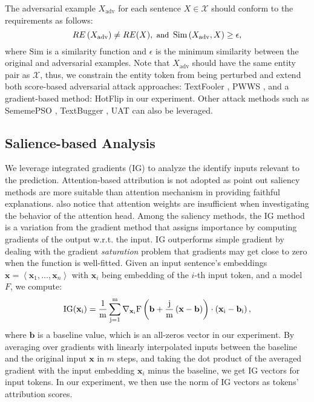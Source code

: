\documentclass[sigconf]{acmart}
\begin{document}
The adversarial example $X_{\mathrm{adv}}$ for each sentence $X \in \mathcal{X}$  should conform to the requirements as follows: 
\begin{equation}
\small
RE\left(X_{\mathrm{adv}} \right) \neq RE(X), \text { and } \operatorname{Sim}\left(X_{\mathrm{adv}}, X\right) \geq \epsilon,
\label{eq:ad_requirement}
\end{equation}
where $\mathrm{Sim}$ is a similarity function  and $\epsilon$ is the minimum similarity between the original and adversarial examples.
Note that $X_{\mathrm{adv}}$ should have the same entity pair as $\mathcal{X}$, thus, we constrain the entity token from being perturbed and extend both score-based adversarial attack approaches: TextFooler \cite{DBLP:conf/aaai/JinJZS20}, PWWS \cite{DBLP:conf/acl/RenDHC19}, and a gradient-based method: HotFlip \cite{DBLP:conf/acl/EbrahimiRLD18} in our experiment.
Other attack methods such as SememePSO \cite{zang-etal-2020-word}, TextBugger \cite{DBLP:conf/ndss/LiJDLW19}, UAT \cite{wallace-etal-2019-universal} can also be leveraged.

\subsection{Salience-based Analysis}
We leverage integrated gradients \cite{DBLP:conf/icml/SundararajanTY17} (IG) to analyze the identify inputs relevant to the prediction.
Attention-based attribution \cite{DBLP:conf/emnlp/WiegreffeP19} is not adopted as \citet{bastings-filippova-2020-elephant} point out saliency methods are more suitable than attention mechanism in providing faithful explanations. \citet{attention-not-commonsense} also notice that attention weights are insufficient when investigating the behavior of the attention head.
Among the saliency methods, the IG method is a variation from the gradient method that assigns importance by computing gradients of the output w.r.t. the input. IG outperforms simple gradient by dealing with the gradient \textit{saturation} problem that gradients may get close to zero when the function is well-fitted. Given an input sentence's embeddings $\mathbf{x}=\left\langle\mathbf{x}_{1}, \ldots, \mathbf{x}_{n}\right\rangle$ with $\mathbf{x}_i$ being embedding of the $i$-th input token, and a model $F$, we compute:
\begin{equation}
\small
\rm{IG}(\mathbf{x}_i)=\frac{1}{m} \sum_{j=1}^{m} \nabla_{\mathbf{x}_{i}} F\left(\mathbf{b}+\frac{j}{m}\left(\mathbf{x}-\mathbf{b}\right)\right) \cdot\left(\mathbf{x}_{i}-\mathbf{b}_{i}\right),
\end{equation}
where $\mathbf{b}$ is a baseline value, which is an all-zeros vector in our experiment. By averaging over gradients with linearly interpolated inputs between the baseline and the original input $\mathbf{x}$ in $m$ steps, and taking the dot product of the averaged gradient with the input embedding $\mathbf{x}_i$ minus the baseline, we get IG vectors for input tokens. In our experiment, we then use the norm of IG vectors as tokens' attribution scores.
\end{document}
